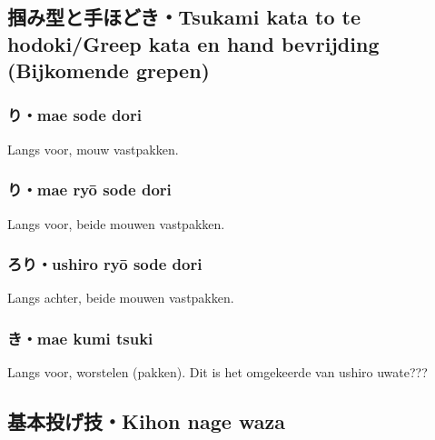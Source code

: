 \subsection{掴み型と手ほどき・Tsukami kata to te hodoki/Greep kata en hand bevrijding (Bijkomende grepen)}
\subsubsection{り・mae sode dori}
Langs voor, mouw vastpakken.

\subsubsection{り・mae ry\={o} sode dori}
Langs voor, beide mouwen vastpakken.

\subsubsection{ろり・ushiro ry\={o} sode dori}
Langs achter, beide mouwen vastpakken.

\subsubsection{き・mae kumi tsuki}
Langs voor, worstelen (pakken). Dit is het omgekeerde van ushiro uwate???

\subsection{基本投げ技・Kihon nage waza}

